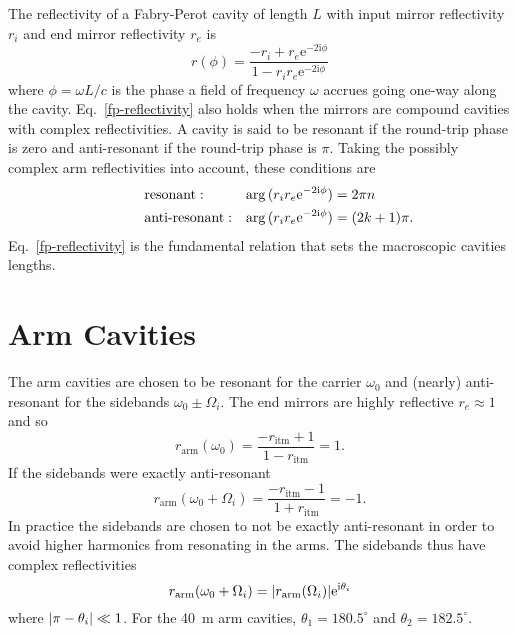\documentclass[12pt]{article}
\newcommand{\mr}[1]{\mathrm{#1}}
\newcommand{\e}{\mr{e}}
\renewcommand{\i}{\mr{i}}
\newcommand{\abs}[1]{\left|#1\right|}
\let\originalleft\left
\let\originalright\right
\renewcommand{\left}{\mathopen{}\mathclose\bgroup\originalleft}
\renewcommand{\right}{\aftergroup\egroup\originalright}
\begin{document}
The reflectivity of a Fabry-Perot cavity of length $L$ with input mirror reflectivity $r_i$ and end mirror reflectivity $r_e$ is
\begin{equation}
r(\phi) = \frac{-r_i + r_e \e^{-2\i\phi}}{1 - r_i r_e \e^{-2\i\phi}}
\label{fp-reflectivity}
\end{equation}
where $\phi = \omega L/c$ is the phase a field of frequency $\omega$ accrues going one-way along the cavity. Eq.~\eqref{fp-reflectivity} also holds when the mirrors are compound cavities with complex reflectivities. A cavity is said to be resonant if the round-trip phase is zero and anti-resonant if the round-trip phase is $\pi$. Taking the possibly complex arm reflectivities into account, these conditions are
\begin{subequations}
\begin{align}
\hspace{0.2\textwidth} &\text{resonant}: & \arg{(r_i r_e \e^{-2\i\phi})} &= 2\pi n \hspace{0.2\textwidth}\\
&\text{anti-resonant}: &\arg{(r_i r_e \e^{-2\i\phi})} &= (2k + 1)\pi.
\end{align}
\end{subequations}
Eq.~\eqref{fp-reflectivity} is the fundamental relation that sets the macroscopic cavities lengths.

\section{Arm Cavities}

The arm cavities are chosen to be resonant for the carrier $\omega_0$ and (nearly) anti-resonant for the sidebands $\omega_0 \pm \Omega_i$. The end mirrors are highly reflective $r_e\approx 1$ and so
\begin{equation}
r_\mr{arm}(\omega_0) = \frac{-r_\mr{itm} + 1}{1 - r_\mr{itm}} = 1.
\end{equation}
If the sidebands were exactly anti-resonant
\begin{equation}
r_\mr{arm}(\omega_0 + \Omega_i) = \frac{-r_\mr{itm} - 1}{1 + r_\mr{itm}} = -1.
\end{equation}
In practice the sidebands are chosen to not be exactly anti-resonant in order to avoid higher harmonics from resonating in the arms. The sidebands thus have complex reflectivities
\begin{equation}
r_\mr{arm}(\omega_0 + \Omega_i) = \abs{r_\mr{arm}(\Omega_i)}\e^{\i \theta_i}
\label{arm-reflectivity}
\end{equation}
where $\abs{\pi - \theta_i} \ll 1$. For the 40~m arm cavities, $\theta_1 = 180.5^\circ$ and $\theta_2  = 182.5^\circ$.
\end{document}
